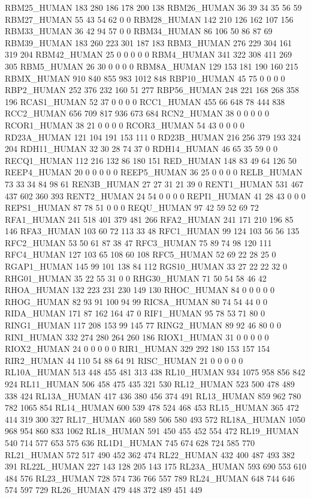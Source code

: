RBM25_HUMAN	183	280	186	178	200	138
RBM26_HUMAN	36	39	34	35	56	59
RBM27_HUMAN	55	43	54	62	0	0
RBM28_HUMAN	142	210	126	162	107	156
RBM33_HUMAN	36	42	94	57	0	0
RBM34_HUMAN	86	106	50	86	87	69
RBM39_HUMAN	183	260	223	301	187	183
RBM3_HUMAN	276	229	304	161	319	204
RBM42_HUMAN	25	0	0	0	0	0
RBM4_HUMAN	341	322	308	411	269	305
RBM5_HUMAN	26	30	0	0	0	0
RBM8A_HUMAN	129	153	181	190	160	215
RBMX_HUMAN	910	840	855	983	1012	848
RBP10_HUMAN	45	75	0	0	0	0
RBP2_HUMAN	252	376	232	160	51	277
RBP56_HUMAN	248	221	168	268	358	196
RCAS1_HUMAN	52	37	0	0	0	0
RCC1_HUMAN	455	66	648	78	444	838
RCC2_HUMAN	656	709	817	936	673	684
RCN2_HUMAN	38	0	0	0	0	0
RCOR1_HUMAN	38	21	0	0	0	0
RCOR3_HUMAN	54	43	0	0	0	0
RD23A_HUMAN	121	104	191	153	111	0
RD23B_HUMAN	216	256	379	193	324	204
RDH11_HUMAN	32	30	28	74	37	0
RDH14_HUMAN	46	65	35	59	0	0
RECQ1_HUMAN	112	216	132	86	180	151
RED_HUMAN	148	83	49	64	126	50
REEP4_HUMAN	20	0	0	0	0	0
REEP5_HUMAN	36	25	0	0	0	0
RELB_HUMAN	73	33	34	84	98	61
REN3B_HUMAN	27	27	31	21	39	0
RENT1_HUMAN	531	467	437	602	360	393
RENT2_HUMAN	24	54	0	0	0	0
REPI1_HUMAN	41	28	43	0	0	0
REPS1_HUMAN	87	78	51	0	0	0
REQU_HUMAN	97	42	59	52	69	72
RFA1_HUMAN	241	518	401	379	481	266
RFA2_HUMAN	241	171	210	196	85	146
RFA3_HUMAN	103	60	72	113	33	48
RFC1_HUMAN	99	124	103	56	56	135
RFC2_HUMAN	53	50	61	87	38	47
RFC3_HUMAN	75	89	74	98	120	111
RFC4_HUMAN	127	103	65	108	60	108
RFC5_HUMAN	52	69	22	28	25	0
RGAP1_HUMAN	145	99	101	138	84	112
RGS10_HUMAN	33	27	22	22	32	0
RHG01_HUMAN	35	22	55	31	0	0
RHG30_HUMAN	71	50	54	58	46	42
RHOA_HUMAN	132	223	231	230	149	130
RHOC_HUMAN	84	0	0	0	0	0
RHOG_HUMAN	82	93	91	100	94	99
RIC8A_HUMAN	80	74	54	44	0	0
RIDA_HUMAN	171	87	162	164	47	0
RIF1_HUMAN	95	78	53	71	80	0
RING1_HUMAN	117	208	153	99	145	77
RING2_HUMAN	89	92	46	80	0	0
RINI_HUMAN	332	274	280	264	260	186
RIOX1_HUMAN	31	0	0	0	0	0
RIOX2_HUMAN	24	0	0	0	0	0
RIR1_HUMAN	329	292	180	153	157	154
RIR2_HUMAN	44	110	54	88	64	91
RISC_HUMAN	21	0	0	0	0	0
RL10A_HUMAN	513	448	455	481	313	438
RL10_HUMAN	934	1075	958	856	842	924
RL11_HUMAN	506	458	475	435	321	530
RL12_HUMAN	523	500	478	489	338	424
RL13A_HUMAN	417	436	380	456	374	491
RL13_HUMAN	859	962	780	782	1065	854
RL14_HUMAN	600	539	478	524	468	453
RL15_HUMAN	365	472	414	319	300	327
RL17_HUMAN	460	589	506	580	493	572
RL18A_HUMAN	1050	968	954	860	833	1062
RL18_HUMAN	591	450	455	452	554	472
RL19_HUMAN	540	714	577	653	575	636
RL1D1_HUMAN	745	674	628	724	585	770
RL21_HUMAN	572	517	490	452	362	474
RL22_HUMAN	432	400	487	493	382	391
RL22L_HUMAN	227	143	128	205	143	175
RL23A_HUMAN	593	690	553	610	484	576
RL23_HUMAN	728	574	736	766	557	789
RL24_HUMAN	648	744	646	574	597	729
RL26_HUMAN	479	448	372	489	451	449
